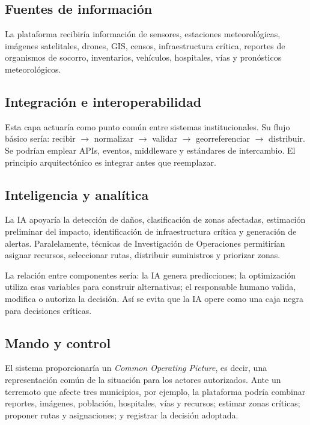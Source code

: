 \documentclass[11pt,a4paper]{article}
\begin{document}
\subsection{Fuentes de información}

La plataforma recibiría información de sensores, estaciones meteorológicas,
imágenes satelitales, drones, GIS, censos, infraestructura crítica, reportes
de organismos de socorro, inventarios, vehículos, hospitales, vías y
pronósticos meteorológicos.

\subsection{Integración e interoperabilidad}

Esta capa actuaría como punto común entre sistemas institucionales. Su flujo
básico sería: recibir $\rightarrow$ normalizar $\rightarrow$ validar
$\rightarrow$ georreferenciar $\rightarrow$ distribuir. Se podrían emplear
APIs, eventos, middleware y estándares de intercambio. El principio
arquitectónico es integrar antes que reemplazar.

\subsection{Inteligencia y analítica}

La IA apoyaría la detección de daños, clasificación de zonas afectadas,
estimación preliminar del impacto, identificación de infraestructura crítica y
generación de alertas. Paralelamente, técnicas de Investigación de Operaciones
permitirían asignar recursos, seleccionar rutas, distribuir suministros y
priorizar zonas.

La relación entre componentes sería: la IA genera predicciones; la
optimización utiliza esas variables para construir alternativas; el
responsable humano valida, modifica o autoriza la decisión. Así se evita que
la IA opere como una caja negra para decisiones críticas.

\subsection{Mando y control}

El sistema proporcionaría un \emph{Common Operating Picture}, es decir, una
representación común de la situación para los actores autorizados. Ante un
terremoto que afecte tres municipios, por ejemplo, la plataforma podría
combinar reportes, imágenes, población, hospitales, vías y recursos; estimar
zonas críticas; proponer rutas y asignaciones; y registrar la decisión
adoptada.
\end{document}
